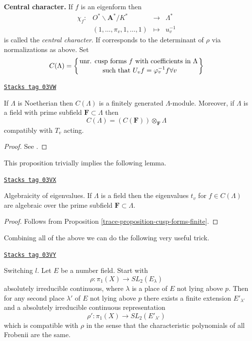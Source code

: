 {\bf Central character.} If $f$ is an eigenform then
$$
\begin{matrix}
\chi_f : &
O^*\backslash \mathbf{A}^*/K^* &
\to &
\Lambda^* \\
&
(1, \ldots, \pi_v, 1, \ldots, 1) &
\mapsto &
u_v^{-1}
\end{matrix}
$$
is called the {\it central character}. If corresponds to the
determinant of $\rho$ via normalizations as above. Set
$$
C(\Lambda) =
\left\{
{\text{unr. cusp forms } f \text{ with coefficients in }\Lambda}
\atop {\text{ such that } U_v f = \varphi_v^{-1}f\forall v}
\right\}
$$

\begin{proposition}
\label{trace-proposition-cusp-forms-finite}
\href{https://stacks.math.columbia.edu/tag/03VW}{\texttt{Stacks tag 03VW}}

If $\Lambda$ is Noetherian then $C(\Lambda)$ is a
finitely generated $\Lambda$-module. Moreover, if $\Lambda$ is a field with
prime subfield $\mathbf{F} \subset \Lambda$ then
$$
C(\Lambda)=(C(\mathbf{F}))\otimes_{\mathbf{F}}\Lambda
$$
compatibly with $T_v$ acting.
\end{proposition}

\begin{proof}
See \cite[Proposition 4.7]{dJ-conjecture}.
\end{proof}

This proposition trivially implies the following lemma.

\begin{lemma}
\label{trace-lemma-eigenvalues-algebraic}
\href{https://stacks.math.columbia.edu/tag/03VX}{\texttt{Stacks tag 03VX}}

Algebraicity of eigenvalues.
If $\Lambda$ is a field then the eigenvalues $t_v$ for $f\in
C(\Lambda)$ are algebraic over the prime subfield
$\mathbf{F} \subset \Lambda$.
\end{lemma}

\begin{proof}

Follows from Proposition \ref{trace-proposition-cusp-forms-finite}.
\end{proof}

Combining all of the above we can do the following very useful trick.

\begin{lemma}[Switch l]
\label{trace-lemma-switch-l}
\href{https://stacks.math.columbia.edu/tag/03VY}{\texttt{Stacks tag 03VY}}

Switching $l$. Let $E$ be a number field.
Start with
$$
\rho : \pi_1(X)\to SL_2(E_\lambda)
$$
absolutely irreducible continuous, where $\lambda$ is a place of $E$
not lying above $p$. Then for any second place $\lambda'$ of $E$
not lying above $p$ there exists a finite extension $E'_{\lambda'}$
and a absolutely irreducible continuous representation
$$
\rho': \pi_1(X)\to SL_2(E'_{\lambda'})
$$
which is compatible with $\rho$ in the sense that the characteristic
polynomials of all Frobenii are the same.
\end{lemma}

